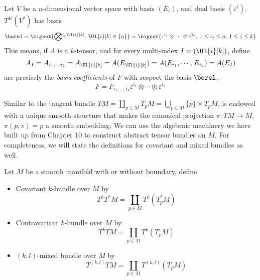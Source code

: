 \documentclass[../main-v2-manifolds.tex]{subfiles}
\begin{document}
\begin{wts}[Basis of {$T^k(V^*)$}]
    Let $V$ be a $n$-dimensional vector space with basis $(E_i)$, and dual basis $(\varepsilon^i)$. $T^K(V^*)$ has basis
    \[
        \borel = \bigset{\bigotimes \varepsilon^{\Ul{i}[k]},\: \Ul{i}[k]\in \{\underline{n}\}} = \bigset{\varepsilon^{i_1}\otimes\cdots\otimes \varepsilon^{i_k},\: 1\leq i_j\leq n,\:  1\leq j\leq k}
    \]
    This means, if $A$ is a $k$-tensor, and for every multi-index $I = (\Ul{i}[k])$, define
    \[
        A_I = A_{i_1,\ldots i_k} = A_{\Ul{i}[k]} = A(E_{\Ul{i}[k]}) = A(E_{i_1},\cdots, E_{i_k}) = A(E_I)
    \]
    are precisely the \emph{basis coefficients} of $F$ with respect the basis $\borel$, 
    \begin{equation}
        F = F_{i_1,\ldots, i_k}\varepsilon^{i_1}\otimes\cdots\otimes\varepsilon^{i_k}
    \end{equation}
\end{wts}
Similar to the tangent bundle $TM = \coprod_{p\in M}T_p M = \bigcup_{p\in M}\{p\}\times T_p M$, is endowed with a unique smooth structure that makes the canonical projection $\pi: TM\to M$, $\pi(p,v)=p$ a smooth embedding. We can use the algebraic machinery we have built up from Chapter 10 to construct abstract tensor bundles on $M$. For completeness, we will state the definitions for covariant and mixed bundles as well.
\begin{definition}\label{lee-chp12:tensor-bundles}
    Let $M$ be a smooth manifold with or without boundary, define
    \begin{itemize}
        \item Covariant $k$-bundle over $M$ by
        \[
            T^kT^*M = \coprod_{p\in M} T^k(T_p^*M)
        \]
        \item Contravariant $k$-bundle over $M$ by
        \[
            T^kTM = \coprod_{p\in M} T^k(T_pM)
        \]
        \item $(k,l)$-mixed bundle over $M$ by
        \[
            T^{(k,l)}TM = \coprod_{p\in M}T^{(k,l)}(T_pM)
        \]
    \end{itemize}
\end{definition}
\end{document}
